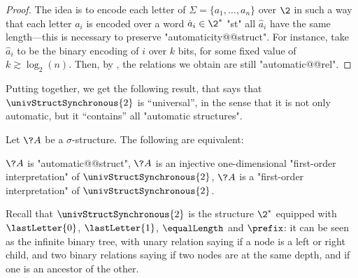 \begin{proof}
	The idea is to encode each letter of $\Sigma = \{a_1,\hdots,a_n\}$
	over $\2$ in such a way that each letter $a_i$
	is encoded over a word $\hat a_i \in \2^*$ "st"
	all $\hat a_i$ have the same length---this is necessary to preserve "automaticity@@struct".
	For instance, take $\hat a_i$ to be the binary encoding of $i$
	over $k$ bits, for some fixed value of $k \gtrsim \log_2(n)$.
	Then, by ,
	the relations we obtain are still "automatic@@rel".
\end{proof}

Putting 
together, we get the following result, that says that $\univStructSynchronous{2}$ is ``universal'',
in the sense that it is not only automatic, but it ``contains'' all "automatic structures".
\begin{proposition}
	\AP\label{prop:universal-automatic-structure}
	Let $\?A$ be a $\sigma$-structure. The following are equivalent:
	\begin{enumerate}
		\itemAP\label{item:universal-automatic-structure-auto}
			$\?A$ is "automatic@@struct",
		\itemAP\label{item:universal-automatic-structure-injective-FO}
			$\?A$ is an injective one-dimensional "first-order interpretation" of
			$\univStructSynchronous{2}$,
		\itemAP\label{item:universal-automatic-structure-FO}
			$\?A$ is a "first-order interpretation" of $\univStructSynchronous{2}$.
	\end{enumerate}
\end{proposition}

Recall that $\univStructSynchronous{2}$ is the structure $\2^*$ equipped
with $\lastLetter{0}$, $\lastLetter{1}$, $\equalLength$ and $\prefix$: it can be
seen as the infinite binary tree, with unary relation saying if a node is a
left or right child, and two binary relations saying if two nodes are
at the same depth, and if one is an ancestor of the other.


